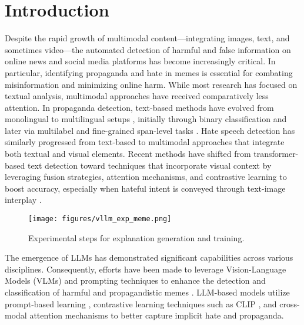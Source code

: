 \section{Introduction}
\label{sec:introduction}

Despite the rapid growth of multimodal content—integrating images, text, and sometimes video—the automated detection of harmful and false information on online news and social media platforms has become increasingly critical. In particular, identifying propaganda and hate in memes is essential for combating misinformation and minimizing online harm. While most research has focused on textual analysis, multimodal approaches have received comparatively less attention. In propaganda detection, text-based methods have evolved from monolingual to multilingual setups \cite{piskorski-etal-2023-multilingual,hasanain-etal-2023-araieval}, initially through binary classification and later via multilabel and fine-grained span-level tasks \cite{BARRONCEDENO20191849,Habernal.et.al.2017.EMNLP,Habernal2018b,da-san-martino-etal-2019-fine}. Hate speech detection has similarly progressed from text-based to multimodal approaches that integrate both textual and visual elements. Recent methods have shifted from transformer-based text detection \cite{fortuna2018survey} toward techniques that incorporate visual context \cite{kiela2020hateful} by leveraging fusion strategies, attention mechanisms, and contrastive learning to boost accuracy, especially when hateful intent is conveyed through text-image interplay \cite{alam2022survey}. 

\begin{figure}[]
    \centering
    \texttt{[image: figures/vllm\_exp\_meme.png]}
    \vspace{-0.4cm}
    \caption{Experimental steps for explanation generation and training.}    
    \label{fig:vllm_exp_meme}
    \vspace{-0.6cm}
\end{figure}

The emergence of LLMs has demonstrated significant capabilities across various disciplines. Consequently, efforts have been made to leverage Vision-Language Models (VLMs) \cite{zhang2024vision} and prompting techniques to enhance the detection and classification of harmful and propagandistic memes \cite{Rui2023}. LLM-based models utilize prompt-based learning \cite{cao-etal-2022-prompting}, contrastive learning techniques such as CLIP \cite{kumar2022hate}, and cross-modal attention mechanisms to better capture implicit hate and propaganda. 



